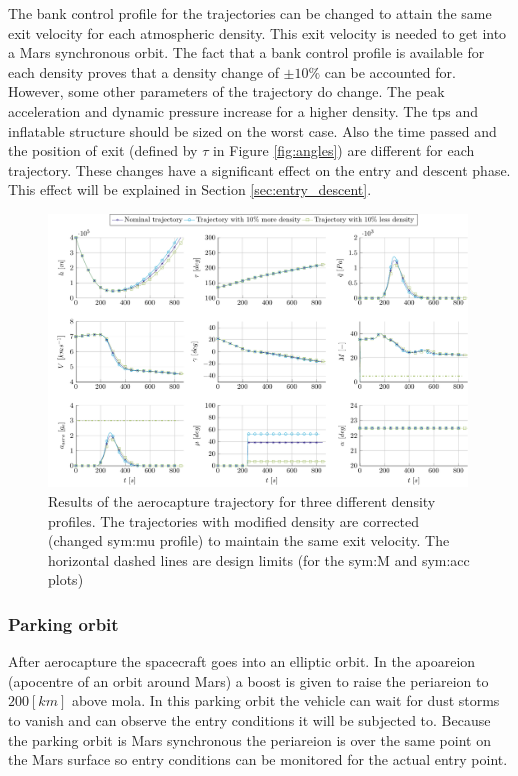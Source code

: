 The bank control profile for the trajectories can be changed to attain the same exit velocity for each atmospheric density. This exit velocity is needed to get into a Mars synchronous orbit. The fact that a bank control profile is available for each density proves that a density change of $\pm 10\%$ can be accounted for. However, some other parameters of the trajectory do change. The peak acceleration and dynamic pressure increase for a higher density. The \gls{tps} and inflatable structure should be sized on the worst case. Also the time passed and the position of exit (defined by $\tau$ in Figure \ref{fig:angles}) are different for each trajectory. These changes have a significant effect on the entry and descent phase. This effect will be explained in Section \ref{sec:entry_descent}.
\begin{figure}
	\centering
	\includegraphics[width=0.99\textwidth]{Figure/Orbit/sensitivity_aerocapture.pdf}
	\caption[Results of the aerocapture trajectory for three different density profiles]{Results of the aerocapture trajectory for three different density profiles. The trajectories with modified density are corrected (changed \gls{sym:mu} profile) to maintain the same exit velocity. The horizontal dashed lines are design limits (for the \gls{sym:M} and \gls{sym:acc} plots) }
	\label{fig:orbit_aerocapture_data}
\end{figure}

\subsubsection{Parking orbit}\label{sec:parking_orbit}
After aerocapture the spacecraft goes into an elliptic orbit. In the apoareion (apocentre of an orbit around Mars) a boost is given to raise the periareion to $200 \left[km\right]$ above \gls{mola}. In this parking orbit the vehicle can wait for dust storms to vanish and can observe the entry conditions it will be subjected to. Because the parking orbit is Mars synchronous the periareion is over the same point on the Mars surface so entry conditions can be monitored for the actual entry point.

